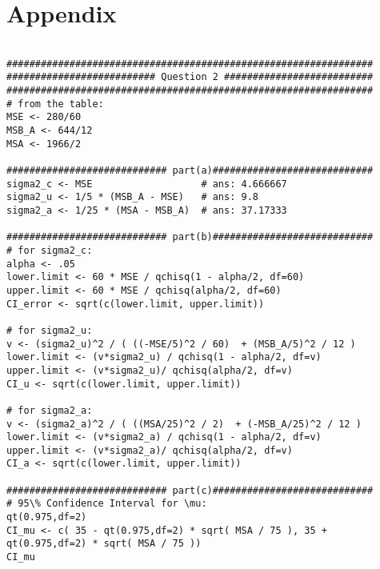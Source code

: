 \documentclass[paper=a4, fontsize=11pt]{scrartcl} %
\begin{document}
\section{Appendix}
\begin{verbatim}

################################################################
########################## Question 2 ##########################
################################################################
# from the table:
MSE <- 280/60
MSB_A <- 644/12
MSA <- 1966/2

############################ part(a)############################
sigma2_c <- MSE                   # ans: 4.666667
sigma2_u <- 1/5 * (MSB_A - MSE)   # ans: 9.8
sigma2_a <- 1/25 * (MSA - MSB_A)  # ans: 37.17333

############################ part(b)############################
# for sigma2_c:
alpha <- .05
lower.limit <- 60 * MSE / qchisq(1 - alpha/2, df=60)
upper.limit <- 60 * MSE / qchisq(alpha/2, df=60)
CI_error <- sqrt(c(lower.limit, upper.limit))

# for sigma2_u:
v <- (sigma2_u)^2 / ( ((-MSE/5)^2 / 60)  + (MSB_A/5)^2 / 12 )
lower.limit <- (v*sigma2_u) / qchisq(1 - alpha/2, df=v)
upper.limit <- (v*sigma2_u)/ qchisq(alpha/2, df=v)
CI_u <- sqrt(c(lower.limit, upper.limit))

# for sigma2_a:
v <- (sigma2_a)^2 / ( ((MSA/25)^2 / 2)  + (-MSB_A/25)^2 / 12 )
lower.limit <- (v*sigma2_a) / qchisq(1 - alpha/2, df=v)
upper.limit <- (v*sigma2_a)/ qchisq(alpha/2, df=v)
CI_a <- sqrt(c(lower.limit, upper.limit))

############################ part(c)############################
# 95\% Confidence Interval for \mu:
qt(0.975,df=2)
CI_mu <- c( 35 - qt(0.975,df=2) * sqrt( MSA / 75 ), 35 + qt(0.975,df=2) * sqrt( MSA / 75 ))
CI_mu













\end{verbatim}


%
% 
\end{document}
